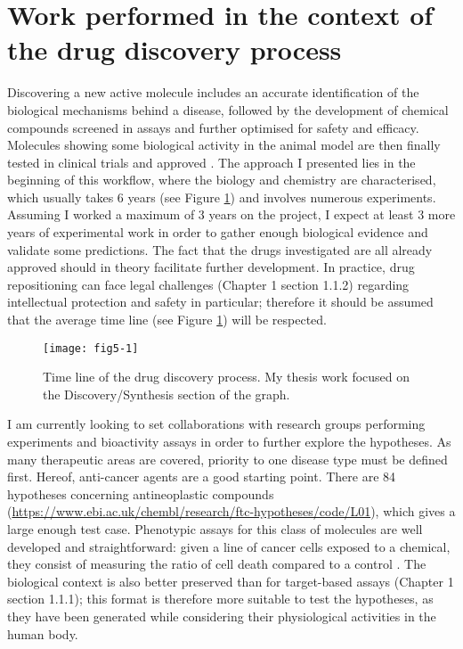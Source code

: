 \section{Work performed in the context of the drug discovery process}
Discovering a new active molecule includes an accurate identification of the biological mechanisms behind a disease, followed by the development of chemical compounds screened in assays and further optimised for safety and efficacy. Molecules showing some biological activity in the animal model are then finally tested in clinical trials and approved \citep{fishman2005pharmaceuticals} \citep{cooper2002optical}. The approach I presented lies in the beginning of this workflow, where the biology and chemistry are characterised, which usually takes 6 years (see Figure \ref{fig5-1}) and involves numerous experiments. Assuming I worked a maximum of 3 years on the project, I expect at least 3 more years of experimental work in order to gather enough biological evidence and validate some predictions.  The fact that the drugs investigated are all already approved should in theory facilitate further development. In practice, drug repositioning can face legal challenges (Chapter 1 section 1.1.2) regarding intellectual protection and safety in particular; therefore it should be assumed that the average time line (see Figure \ref{fig5-1}) will be respected.

\begin{figure}[ht]
    \centering
    \texttt{[image: fig5-1]}
    \caption{Time line of the drug discovery process. My thesis work focused on the Discovery/Synthesis section of the graph.}
    \label{fig5-1}
\end{figure}

I am currently looking to set collaborations with research groups performing experiments and bioactivity assays in order to further explore the hypotheses. As many therapeutic areas are covered, priority to one disease type must be defined first. Hereof, anti-cancer agents are a good starting point. There are 84 hypotheses concerning antineoplastic compounds (\url{https://www.ebi.ac.uk/chembl/research/ftc-hypotheses/code/L01}), which gives a large enough test case. Phenotypic assays for this class of molecules are well developed and straightforward: given a line of cancer cells exposed to a chemical, they consist of measuring the ratio of cell death compared to a control \citep{garnett2012systematic}. The biological context is also better preserved than for target-based assays (Chapter 1 section 1.1.1); this format is therefore more suitable to test the hypotheses, as they have been generated while considering their physiological activities in the human body.


